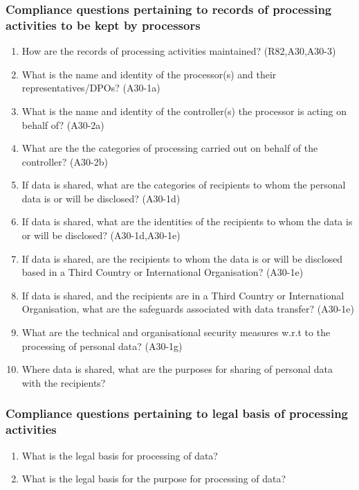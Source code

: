 \subsubsection{Compliance questions pertaining to records of processing activities to be kept by processors}\label{sec:info:CQ:2}
\begin{enumerate}[label={\textit{CMQ.\theenumi}},resume]
    \item How are the records of processing activities maintained? (R82,A30,A30-3)
    \item What is the name and identity of the processor(s) and their representatives/DPOs? (A30-1a)
    \item What is the name and identity of the controller(s) the processor is acting on behalf of? (A30-2a)
    \item What are the the categories of processing carried out on behalf of the controller? (A30-2b)
    \item If data is shared, what are the categories of recipients to whom the personal data is or will be disclosed? (A30-1d)
    \item If data is shared, what are the identities of the recipients to whom the data is or will be disclosed? (A30-1d,A30-1e)
    \item If data is shared, are the recipients to whom the data is or will be disclosed based in a Third Country or International Organisation? (A30-1e)
    \item If data is shared, and the recipients are in a Third Country or International Organisation, what are the safeguards associated with data transfer? (A30-1e)
    \item What are the technical and organisational security measures w.r.t to the processing of personal data? (A30-1g)
    \item Where data is shared, what are the purposes for sharing of personal data with the recipients?
\end{enumerate}
\subsubsection{Compliance questions pertaining to legal basis of processing activities}\label{sec:info:CQ:3}
\begin{enumerate}[label={\textit{CMQ.\theenumi}},resume]
    \item What is the legal basis for processing of data?
    \item What is the legal basis for the purpose for processing of data?
\end{enumerate}

